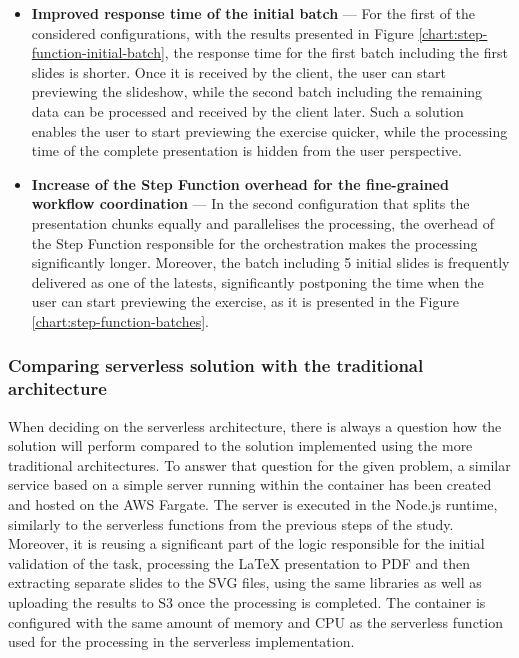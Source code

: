 \begin{itemize}
   \item \textbf{Improved response time of the initial batch} --- For the first of the considered configurations, with the results presented in Figure \ref{chart:step-function-initial-batch}, the response time for the first batch including the first slides is shorter.
   Once it is received by the client, the user can start previewing the slideshow, while the second batch including the remaining data can be processed and received by the client later.
   Such a solution enables the user to start previewing the exercise quicker, while the processing time of the complete presentation is hidden from the user perspective.
   \item \textbf{Increase of the Step Function overhead for the fine-grained workflow coordination} --- In the second configuration that splits the presentation chunks equally and parallelises the processing, the overhead of the Step Function responsible for the orchestration makes the processing significantly longer.
   Moreover, the batch including 5 initial slides is frequently delivered as one of the latests, significantly postponing the time when the user can start previewing the exercise, as it is presented in the Figure \ref{chart:step-function-batches}.
\end{itemize}

\subsubsection{Comparing serverless solution with the traditional architecture}

When deciding on the serverless architecture, there is always a question how the solution will perform compared to the solution implemented using the more traditional architectures.
To answer that question for the given problem, a similar service based on a simple server running within the container has been created and hosted on the AWS Fargate. 
The server is executed in the Node.js runtime, similarly to the serverless functions from the previous steps of the study.
Moreover, it is reusing a significant part of the logic responsible for the initial validation of the task, processing the LaTeX presentation to PDF and then extracting separate slides to the SVG files, using the same libraries as well as uploading the results to S3 once the processing is completed.
The container is configured with the same amount of memory and CPU as the serverless function used for the processing in the serverless implementation.

